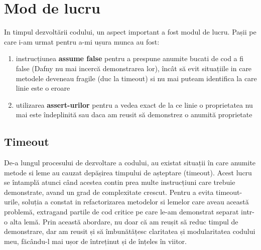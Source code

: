 \section{Mod de lucru}
In timpul dezvoltării codului, un aspect important a fost modul de lucru. Pașii pe care i-am urmat pentru a-mi ușura munca au fost:
\begin{enumerate}
    \item instrucțiunea \textbf{assume false} pentru a prespune anumite bucati de cod a fi false (Dafny nu mai incercă demonstrarea lor), încât să evit situațiile in care metodele deveneau fragile (duc la timeout) si nu mai puteam identifica la care linie este o eroare
    \item utilizarea \textbf{assert-urilor} pentru a vedea exact de la ce linie o proprietatea nu mai este îndeplinită sau daca am reusit să demonstrez o anumită proprietate
\end{enumerate}
\subsection{Timeout}
De-a lungul procesului de dezvoltare a codului, au existat situații în care anumite metode si leme au cauzat depășirea timpului de așteptare (timeout). Acest lucru se întamplă atunci când acestea contin prea multe instrucțiuni care trebuie demonstrate, avand un grad de complexitate crescut.
Pentru a evita timeout-urile, soluția a constat in refactorizarea metodelor si lemelor care aveau această problemă, extragand partile de cod critice pe care le-am demonstrat separat intr-o alta lemă. Prin această abordare, nu doar că am reușit să reduc timpul de demonstrare, dar am reusit și să îmbunătățesc claritatea și modularitatea codului meu, făcându-l mai ușor de întreținut și de înțeles în viitor.

















